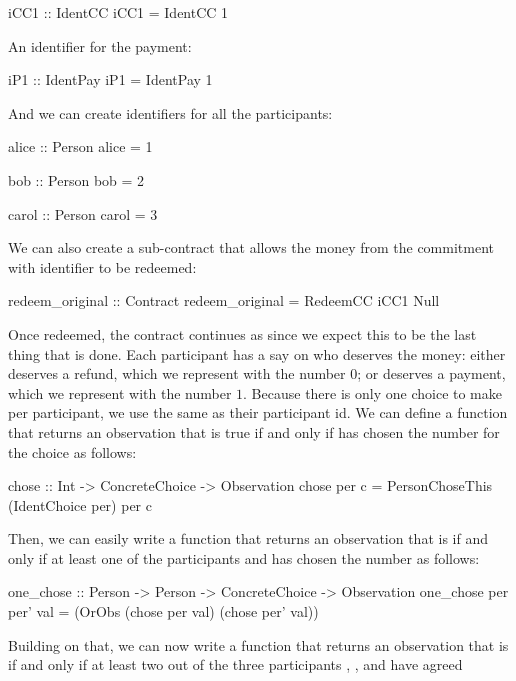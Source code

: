 \documentclass[runningheads]{llncs}
\begin{document}
\begin{haskellcode}
iCC1 :: IdentCC
iCC1 = IdentCC 1
\end{haskellcode}
An identifier for the payment:
\begin{haskellcode}
iP1 :: IdentPay
iP1 = IdentPay 1
\end{haskellcode}
And we can create identifiers for all the participants:
\begin{haskellcode}
alice :: Person
alice = 1

bob :: Person
bob = 2

carol :: Person
carol = 3
\end{haskellcode}
We can also create a sub-contract that allows the money from the commitment with identifier  
to be redeemed:
\begin{haskellcode}
redeem_original :: Contract
redeem_original = RedeemCC iCC1 Null
\end{haskellcode}
Once redeemed, the contract continues as  since we expect this to be the last thing that is done.
Each participant has a say on who deserves the money: either  deserves a refund, which 
we represent with the number $0$; or  deserves a payment, which we represent with the 
number $1$. Because there is only one choice to make per participant, we use the same  as 
their participant id. We can define a function that returns an observation that is true if and only if
 has chosen the number  for the choice  as follows:
\begin{haskellcode}
chose :: Int -> ConcreteChoice -> Observation
chose per c = PersonChoseThis (IdentChoice per) per c
\end{haskellcode}
Then, we can easily write a function that returns an observation that is  if and only if at least 
one of the participants  and  has chosen the number  as 
follows:
\begin{haskellcode}
one_chose :: Person -> Person -> ConcreteChoice -> Observation
one_chose per per' val = (OrObs (chose per val) (chose per' val)) 
\end{haskellcode}
Building on that, we can now write a function that returns an observation that is  if and only if 
at least two out of the three participants , , and  have agreed 
\end{document}

